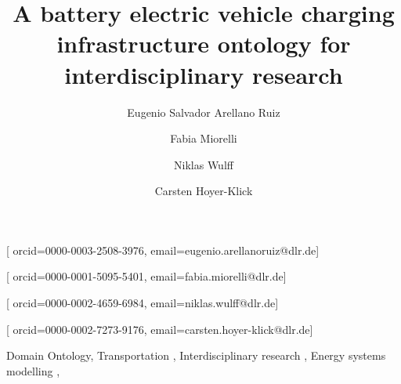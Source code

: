\documentclass[hf]{ceurart}
\theoremstyle{empty}
\theoremstyle{emptybreak}
\begin{document}
  
\makeatletter

\newlength\oriarrayrulewidth  
\newcount\orilowpenalty
\newcommand\nobreakmidrule{%
 \noalign{\global\oriarrayrulewidth\arrayrulewidth\relax
          \global\orilowpenalty\@lowpenalty\relax  
          \global\@lowpenalty=\numexpr-10000\relax%
          \global\arrayrulewidth\lightrulewidth\relax}
 \hline
 \noalign{\global\@lowpenalty=\orilowpenalty\relax%
          \global\arrayrulewidth\oriarrayrulewidth\relax}}

\makeatother


\title{A battery electric vehicle charging infrastructure ontology for interdisciplinary research}

\author[1]{{Eugenio Salvador} {Arellano Ruiz}}[%
orcid=0000-0003-2508-3976,
email=eugenio.arellanoruiz@dlr.de]
\author[1]{Fabia Miorelli}[%
orcid=0000-0001-5095-5401,
email=fabia.miorelli@dlr.de]
\author[1]{Niklas Wulff}[%
orcid=0000-0002-4659-6984,
email=niklas.wulff@dlr.de]
\author[1]{Carsten Hoyer-Klick}[%
orcid=0000-0002-7273-9176,
email=carsten.hoyer-klick@dlr.de]


\address[1]{German Aerospace Center (DLR), Department of Energy Systems Analysis, Institute of Networked
	Energy Systems, Stuttgart, Germany}




\begin{keywords}
  Domain Ontology\sep 
  Transportation \sep 
  Interdisciplinary research \sep 
  Energy systems modelling \sep 
\end{keywords}


\maketitle













% 



\newpage
\appendix
\end{document}
